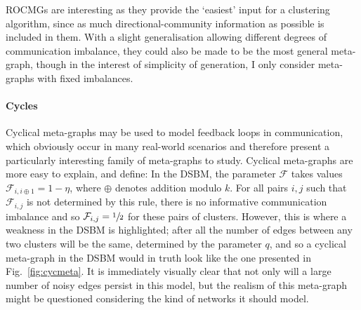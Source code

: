 ROCMGs are interesting as they provide the `easiest' input for a clustering algorithm, since
as much directional-community information as possible is included in them. With a slight 
generalisation allowing different degrees of communication imbalance, they could also be made to 
be the most general meta-graph, though in the interest of simplicity of generation, I only 
consider meta-graphs with fixed imbalances. 

\paragraph{Cycles} Cyclical meta-graphs may be used to model feedback loops in communication,
which obviously occur in many real-world scenarios and therefore present a particularly interesting
family of meta-graphs to study. Cyclical meta-graphs are more easy to explain, and define: In the
DSBM, the parameter $\mathcal F$ takes values $\mathcal{F}_{i, i\oplus 1} = 1-\eta$, where $\oplus$
denotes addition modulo $k$. For all pairs $i,j$ such that $\mathcal 
F_{i,j}$ is not determined by this rule, there is no informative communication imbalance and so 
$\mathcal F_{i,j} = \sfrac12$ for these pairs of clusters. However, this is where a weakness in the
DSBM is highlighted; after all the number of edges between any two clusters will be the same, 
determined by the parameter $q$, and so a cyclical meta-graph in the DSBM would in truth look like 
the one presented in Fig.\ \ref{fig:cycmeta}. It is immediately visually clear that not only will
a large number of noisy edges persist in this model, but the realism of this meta-graph might be 
questioned considering the kind of networks it should model. 


